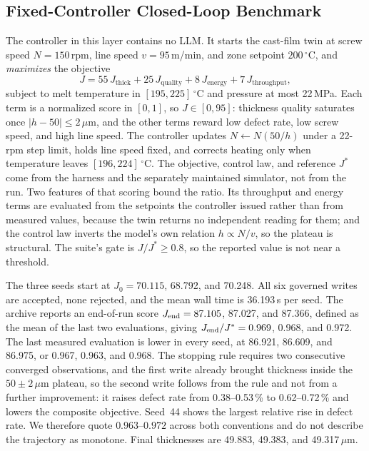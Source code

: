 \subsection{Fixed-Controller Closed-Loop Benchmark}
\label{sec:clbench}
The controller in this layer contains no LLM. It starts the cast-film twin at screw
speed $N=150$\,rpm, line speed $v=95$\,m/min, and zone setpoint $200\,^\circ$C, and
\emph{maximizes} the objective
\begin{equation}
J = 55\,J_\text{thick} + 25\,J_\text{quality} +
8\,J_\text{energy} + 7\,J_\text{throughput},
\label{eq:objective}
\end{equation}
subject to melt temperature in $[195,225]\,^\circ$C and pressure at most 22\,MPa.
Each term is a normalized score in $[0,1]$, so $J\in[0,95]$: thickness quality
saturates once $|h-50|\leq2\,\mu$m, and the other terms reward low defect rate, low
screw speed, and high line speed. The controller updates $N\leftarrow N(50/h)$ under
a 22-rpm step limit, holds line speed fixed, and corrects heating only when
temperature leaves $[196,224]\,^\circ$C. The objective, control law, and reference $J^{*}$ come from the harness and the separately maintained simulator, not from the run. Two features of that scoring bound the ratio. Its throughput and energy terms are evaluated from the setpoints the controller issued rather than from measured values, because the twin returns no independent reading for them; and the control law inverts the model's own relation $h\propto N/v$, so the plateau is structural. The suite's gate is $J/J^{*}\geq0.8$, so the reported value is not near a threshold.

The three seeds start at $J_0=70.115$, 68.792, and 70.248. All six governed writes
are accepted, none rejected, and the mean wall time is 36.193\,s per seed. The
archive reports an end-of-run score $J_{\rm end}=87.105$, 87.027, and 87.366,
defined as the mean of the last two evaluations, giving
$J_{\rm end}/J^{*}=0.969$, 0.968, and 0.972. The last measured evaluation is lower
in every seed, at 86.921, 86.609, and 86.975, or 0.967, 0.963, and 0.968. The
stopping rule requires two consecutive converged observations, and the first write
already brought thickness inside the $50\pm2\,\mu$m plateau, so the second write
follows from the rule and not from a further improvement: it raises defect rate from 0.38--0.53\,\% to 0.62--0.72\,\% and lowers the composite objective. Seed~44 shows the largest relative rise in defect rate. We therefore
quote $0.963$--$0.972$ across both conventions and do not describe the trajectory as
monotone. Final thicknesses are 49.883, 49.383, and 49.317\,$\mu$m.


